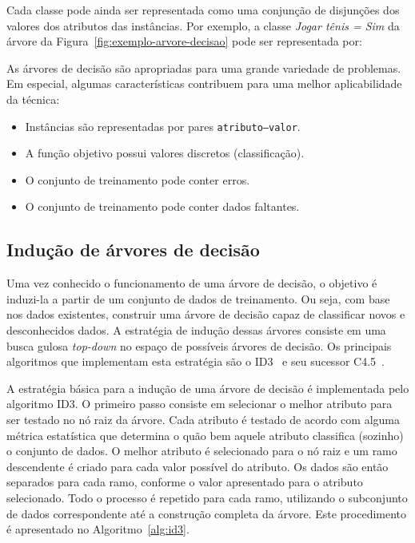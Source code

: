 Cada classe pode ainda ser representada como uma conjunção de disjunções dos valores dos atributos das instâncias. Por exemplo, a classe \textit{Jogar tênis = Sim} da árvore da Figura~\ref{fig:exemplo-arvore-decisao} pode ser representada por:

\insertspace


\insertspace

As árvores de decisão são apropriadas para uma grande variedade de problemas. Em especial, algumas características contribuem para uma melhor aplicabilidade da técnica:

\begin{itemize}
	\item Instâncias são representadas por pares \texttt{atributo--valor}.
	\item A função objetivo possui valores discretos (classificação).
	\item O conjunto de treinamento pode conter erros.
	\item O conjunto de treinamento pode conter dados faltantes.
\end{itemize}

\subsection{Indução de árvores de decisão}

Uma vez conhecido o funcionamento de uma árvore de decisão, o objetivo é induzi-la a partir de um conjunto de dados de treinamento. Ou seja, com base nos dados existentes, construir uma árvore de decisão capaz de classificar novos e desconhecidos dados. A estratégia de indução dessas árvores consiste em uma busca gulosa \textit{top-down} no espaço de possíveis árvores de decisão. Os principais algoritmos que implementam esta estratégia são o ID3~\citep{Quinlan1986} e seu sucessor C4.5~\citep{Quinlan1993}.

A estratégia básica para a indução de uma árvore de decisão é implementada pelo algoritmo ID3. O primeiro passo consiste em selecionar o melhor atributo para ser testado no nó raiz da árvore. Cada atributo é testado de acordo com alguma métrica estatística que determina o quão bem aquele atributo classifica (sozinho) o conjunto de dados. O melhor atributo é selecionado para o nó raiz e um ramo descendente é criado para cada valor possível do atributo. Os dados são então separados para cada ramo, conforme o valor apresentado para o atributo selecionado. Todo o processo é repetido para cada ramo, utilizando o subconjunto de dados correspondente até a construção completa da árvore. Este procedimento é apresentado no Algoritmo~\ref{alg:id3}.

